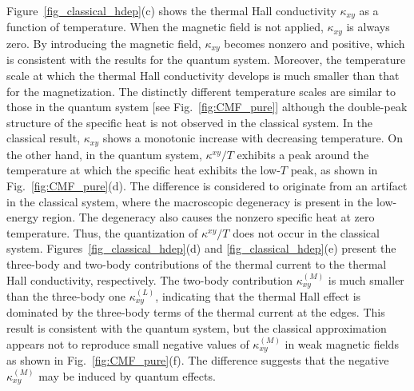\documentclass[twocolumn,superscriptaddress,showpacs, longbibliography, aps, prb]{revtex4-2}
\begin{document}
Figure~\ref{fig_classical_hdep}(c) shows the thermal Hall conductivity $\kappa_{xy}$ as a function of temperature.
When the magnetic field is not applied, 
$\kappa_{xy}$ is always zero.
By introducing the magnetic field, $\kappa_{xy}$ becomes nonzero and positive, which is consistent with the results for the quantum system.
Moreover, the temperature scale %
at which the thermal Hall conductivity 
develops
is much smaller than that for the magnetization.
The distinctly different temperature scales %
are similar to those in the quantum system [see Fig.~\ref{fig:CMF_pure}] although the double-peak structure of the specific heat is not observed in the classical system.
In the classical result, $\kappa_{xy}$ shows a monotonic increase with decreasing temperature.
On the other hand, in the quantum system, $\kappa^{xy}/T$ %
exhibits a peak around the temperature at which the specific heat exhibits the low-$T$ peak, as shown in Fig.~\ref{fig:CMF_pure}(d). %
The difference is considered to originate from an artifact in the classical system, where the macroscopic degeneracy is present in the low-energy region.
The degeneracy also causes the nonzero specific heat at zero temperature. %
Thus, the quantization of $\kappa^{xy}/T$ does not occur in the classical system.
Figures~\ref{fig_classical_hdep}(d) and \ref{fig_classical_hdep}(e) present the three-body and two-body contributions of the thermal current to the thermal Hall conductivity, respectively.
The two-body %
contribution $\kappa_{xy}^{(M)}$ is much smaller than the three-body one $\kappa_{xy}^{(L)}$, indicating that the thermal Hall effect is dominated by the three-body terms of the thermal current at the edges.
This result is consistent with the quantum system, but the classical approximation appears not to reproduce small negative values of $\kappa_{xy}^{(M)}$ in weak magnetic fields as shown in Fig.~\ref{fig:CMF_pure}(f). %
The difference suggests that the negative $\kappa_{xy}^{(M)}$ may be induced by
quantum effects.
\end{document}
